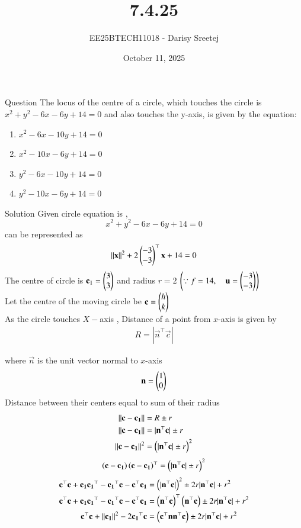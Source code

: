 \documentclass{beamer}
\title %
{7.4.25}
\date{October 11, 2025}
\author %
{EE25BTECH11018 - Darisy Sreetej}
\begin{document}
\frame{\titlepage}

\begin{frame}{Question}
The locus of the centre of a circle, which touches the circle is $x^2 + y^2 -6x -6y +14 =0$ and also touches the y-axis, is given by the equation:
\begin{enumerate}
    \item $x^2-6x-10y+14=0$
    \item $x^2-10x-6y+14=0$
    \item $y^2-6x-10y+14=0$
    \item $y^2-10x-6y+14=0$
\end{enumerate}
\end{frame}
\begin{frame}{Solution}
Given circle equation is ,
$$x^2 + y^2 -6x -6y +14 =0$$
can be represented as 
\begin{align}
    \left\lVert\mathbf{x}\right\rVert^2+2\begin{pmatrix}-3\\-3\end{pmatrix}^\top\mathbf{x}+14=0
\end{align}
The centre of circle is $\mathbf{c}_1=\begin{pmatrix}3\\3\end{pmatrix}$ and radius $r=2$ $\left(\because f= 14 ,\quad \mathbf{u}=\begin{pmatrix}-3\\-3\end{pmatrix}\right) $\\
Let the centre of the moving circle be $\mathbf{c}=\begin{pmatrix}h\\k\end{pmatrix}$\\
As the circle touches $X-$axis , Distance of a point from $x$-axis is given by
\begin{align}
    R=|\vec{n}^\top\vec{c}|
\end{align}
\end{frame}
\begin{frame}
where $\vec{n}$ is the unit vector normal to $x$-axis\\
\begin{align}
 \mathbf{n}=\begin{pmatrix}1\\0\end{pmatrix}
\end{align}
Distance between their centers equal to sum of their radius
\begin{align}
    \left\lVert\mathbf{c}-\mathbf{c_1}\right\rVert&=R \pm r\\
\left\lVert\mathbf{c}-\mathbf{c_1}\right\rVert&=|\mathbf{n}^\top\mathbf{c}| \pm r\\
\left\lVert\mathbf{c}-\mathbf{c_1}\right\rVert^2&=\left(|\mathbf{n}^\top\mathbf{c}| \pm r\right)^2 
\end{align}
\begin{align}
\left(\mathbf{c}-\mathbf{c_1}\right)\left(\mathbf{c}-\mathbf{c_1}\right)^\top=\left(|\mathbf{n}^\top\mathbf{c}| \pm r\right)^2 
\end{align}
\begin{align}
\mathbf{c}^\top\mathbf{c}+\mathbf{c_1}\mathbf{c_1}^\top-\mathbf{c_1}^\top\mathbf{c}-\mathbf{c}^\top\mathbf{c_1}&= \left(|\mathbf{n}^\top\mathbf{c}|\right)^2 \pm 2r|\mathbf{n}^\top\mathbf{c}|+r^2\\
\mathbf{c}^\top\mathbf{c}+\mathbf{c_1}\mathbf{c_1}^\top-\mathbf{c_1}^\top\mathbf{c}-\mathbf{c}^\top\mathbf{c_1}&= \left(\mathbf{n}^\top\mathbf{c}\right)^\top\left(\mathbf{n}^\top\mathbf{c}\right)  \pm 2r|\mathbf{n}^\top\mathbf{c}|+r^2\\
\mathbf{c}^\top\mathbf{c}+\left\lVert\mathbf{c_1}\right\rVert^2-2\mathbf{c_1}^\top\mathbf{c}&=\left(\mathbf{c}^\top\mathbf{n}\mathbf{n}^\top\mathbf{c}\right) \pm 2r|\mathbf{n}^\top\mathbf{c}|+ r^2
\end{align}
\end{frame}
\end{document}
